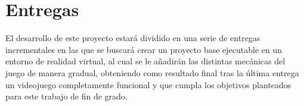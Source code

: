 

\minitoc


\section{Entregas}
\label{sec:planentregas}

El desarrollo de este proyecto estará dividido en una serie de entregas incrementales en las que se buscará crear un proyecto base ejecutable en un entorno de realidad virtual, al cual se le añadirán las distintas mecánicas del juego de manera gradual, obteniendo como resultado final tras la última entrega un videojuego completamente funcional y que cumpla los objetivos planteados para este trabajo de fin de grado.



